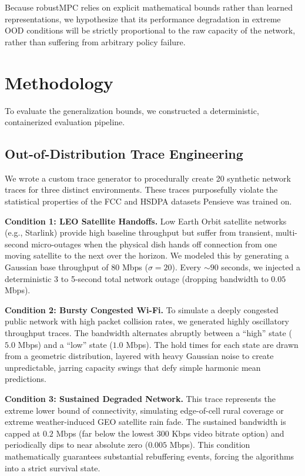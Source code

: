 \documentclass[10pt, conference, compsocconf]{IEEEtran}
\begin{document}
Because robustMPC relies on explicit mathematical bounds rather than learned representations, we hypothesize that its performance degradation in extreme OOD conditions will be strictly proportional to the raw capacity of the network, rather than suffering from arbitrary policy failure.

\section{Methodology}

To evaluate the generalization bounds, we constructed a deterministic, containerized evaluation pipeline.

\subsection{Out-of-Distribution Trace Engineering}

We wrote a custom trace generator to procedurally create 20 synthetic network traces for three distinct environments. These traces purposefully violate the statistical properties of the FCC and HSDPA datasets Pensieve was trained on.

\textbf{Condition 1: LEO Satellite Handoffs.}
Low Earth Orbit satellite networks (e.g., Starlink) provide high baseline throughput but suffer from transient, multi-second micro-outages when the physical dish hands off connection from one moving satellite to the next over the horizon.
We modeled this by generating a Gaussian base throughput of 80 Mbps ($\sigma = 20$). Every $\sim 90$ seconds, we injected a deterministic 3 to 5-second total network outage (dropping bandwidth to $0.05$ Mbps).

\textbf{Condition 2: Bursty Congested Wi-Fi.}
To simulate a deeply congested public network with high packet collision rates, we generated highly oscillatory throughput traces. The bandwidth alternates abruptly between a ``high'' state ($5.0$ Mbps) and a ``low'' state ($1.0$ Mbps). The hold times for each state are drawn from a geometric distribution, layered with heavy Gaussian noise to create unpredictable, jarring capacity swings that defy simple harmonic mean predictions.

\textbf{Condition 3: Sustained Degraded Network.}
This trace represents the extreme lower bound of connectivity, simulating edge-of-cell rural coverage or extreme weather-induced GEO satellite rain fade. The sustained bandwidth is capped at $0.2$ Mbps (far below the lowest 300 Kbps video bitrate option) and periodically dips to near absolute zero ($0.005$ Mbps). This condition mathematically guarantees substantial rebuffering events, forcing the algorithms into a strict survival state.
\end{document}
